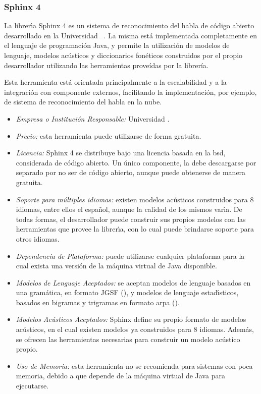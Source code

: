 \subsubsection{Sphinx 4}
\label{sec:sphinx}

La librer{\'\i}a Sphinx 4 es un sistema de reconocimiento del habla de c\'odigo abierto desarrollado en
la Universidad \mbox{ \cite{Sphinx4}}. La misma est\'a implementada
completamente en el lenguaje de programaci\'on Java, y permite la utilizaci\'on de modelos de lenguaje,
modelos ac\'usticos y diccionarios fon\'eticos construidos por el propio desarrollador utilizando las
herramientas proveídas por la librer\'ia.

Esta herramienta est\'a orientada principalmente a la escalabilidad y a la integraci\'on con
componente externos, facilitando la implementaci\'on, por ejemplo, de sistema de reconocimiento del
habla en la nube.

\begin{itemize}
	\item \emph{Empresa o Instituci\'on Responsable:} Universidad .
	\item \emph{Precio:} esta herramienta puede utilizarse de forma gratuita.
	\item \emph{Licencia:} Sphinx 4 se distribuye bajo una licencia basada en la \gls{bsd}, considerada
	de c\'odigo abierto. Un \'unico componente, la  debe descargarse por
	separado por no ser de c\'odigo abierto, aunque puede obtenerse de manera gratuita.
	\item \emph{Soporte para m\'ultiples idiomas:} existen modelos ac\'usticos construidos para
	8 idiomas, entre ellos el espa\~nol, aunque la calidad de los mismos var{\'\i}a.
	De todas formas, el desarrollador puede construir sus propios modelos con las herramientas
	que provee la librer{\'\i}a, con lo cual puede brindarse soporte para otros idiomas.
	\item \emph{Dependencia de Plataforma:} puede utilizarse cualquier plataforma para la cual
	exista una versi\'on de la m\'aquina virtual de Java disponible.
	\item \emph{Modelos de Lenguaje Aceptados:} se aceptan modelos de lenguaje basados en una
        gram\'atica, en formato JGSF (), y modelos de 
        lenguaje estad{\'\i}sticos, basados en bigramas y trigramas en formato \gls{arpa} ().
	\item \emph{Modelos Ac\'usticos Aceptados:} Sphinx define su propio formato de modelos ac\'usticos,
	en el cual existen modelos ya construidos para 8 idiomas. Adem\'as, se ofrecen las herramientas
	necesarias para construir un modelo ac\'ustico propio.
	\item \emph{Uso de Memoria:} esta herramienta no se recomienda para sistemas con poca memoria,
	debido a que depende de la m\'aquina virtual de Java para ejecutarse.
\end{itemize}
